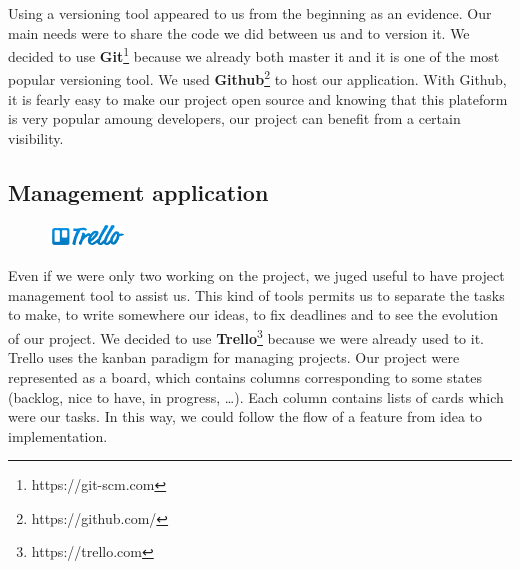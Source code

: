 Using a versioning tool appeared to us from the beginning as an evidence. Our main needs were to share the code we did between us and to version it. We decided to use \textbf{Git}\footnote{https://git-scm.com} because we already both master it and it is one of the most popular versioning tool. We used \textbf{Github}\footnote{https://github.com/} to host our application. With Github, it is fearly easy to make our project open source and knowing that this plateform is very popular amoung developers, our project can benefit from a certain visibility.

\subsection{Management application}

\begin{figure}
	\vspace{-5mm}
	\includegraphics[width =2cm]{images/Trello_Logo.png}
\end{figure}


Even if we were only two working on the project, we juged useful to have project management tool to assist us. This kind of tools permits us to separate the tasks to make, to write somewhere our ideas, to fix deadlines and to see the evolution of our project. We decided to use \textbf{Trello}\footnote{https://trello.com} because we were already used to it. Trello uses the kanban paradigm for managing projects. Our project were represented as a board, which contains columns corresponding to some states (backlog, nice to have, in progress, \dots). Each column contains lists of cards which were our tasks. In this way, we could follow the flow of a feature from idea to implementation.

